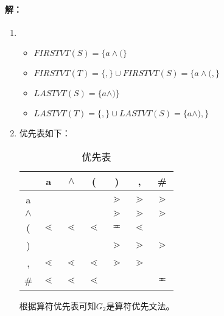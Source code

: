 \paragraph{解：}
\begin{enumerate}
	\item 
	\begin{itemize}
		\item $FIRSTVT(S)=\{a \wedge (\}$
		\item $FIRSTVT(T)=\{, \} \cup FIRSTVT(S)=\{a \wedge ( ,\}$
		\item $LASTVT(S)=\{a \wedge )\}$
		\item $LASTVT(T)=\{, \} \cup LASTVT(S)=\{a \wedge ) ,\}$
	\end{itemize}
	\item 优先表如下：
	\begin{table}[H]
		\caption{优先表}
		\centering
		\begin{tabular}{|c|c|c|c|c|c|c|}
			\hline & a & $\wedge$ & ( & ) & , & \# \\\hline
			a & & & & $\gtrdot$ & $\gtrdot$ & $\gtrdot$ \\
			
			$\wedge$ & & & & $\gtrdot$ & $\gtrdot$ & $\gtrdot$ \\
			
			( & $\lessdot$ & $\lessdot$ & $\lessdot$ & $\eqcirc$ & $\lessdot$ & \\
			
			) & & & & $\gtrdot$ & $\gtrdot$ & $\gtrdot$ \\
			
			, & $\lessdot$ & $\lessdot$ & $\lessdot$ & $\gtrdot$ & $\gtrdot$ & \\
			
			\# & $\lessdot$ & $\lessdot$ & $\lessdot$ & & & $\eqcirc$ \\\hline
		\end{tabular}
	\end{table}
	根据算符优先表可知$G_{2}$是算符优先文法。
	

\end{enumerate}
